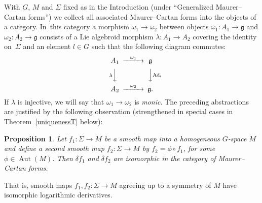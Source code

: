 \documentclass[11pt]{article}
\numberwithin{equation}{section}
\numberwithin{equation}{section}
\newtheorem{Proposition}[Theorem]{Proposition}
\DeclareMathOperator{\Adjoint}{Ad}
\DeclareMathOperator{\automorphism}{Aut}
\begin{document}
With $G$, $M$ and $\Sigma $ fixed as in the Introduction (under
``Generalized Maurer--Cartan forms'') we collect all associated
Maurer--Cartan forms into the objects of a category. In~this category a
morphism $\omega_1 \rightarrow \omega_2$ between objects
$\omega_1 \colon A_1 \rightarrow {\mathfrak g} $ and
$\omega_2 \colon A_2 \rightarrow {\mathfrak g} $ consists of a Lie
algebroid morphism $\lambda \colon A_1 \rightarrow A_2$ covering the
identity on~$\Sigma $ and an element $l \in G$ such that the following
diagram commutes:
 \begin{equation*}
 \begin{CD} A_1 @>{\omega_1}>> {\mathfrak g} \\ @V{\lambda}VV
@VV{\Adjoint_l}V \\ A_2 @>{\omega_2}>> {\mathfrak g}.
 \end{CD}
 \end{equation*} If $\lambda$ is injective, we will say that $\omega_1
\rightarrow \omega_2$ is {\it monic}. The preceding abstractions are
justified by the following observation (strengthened in special cases
in Theorem~\ref{uniquenessT} below):

\begin{Proposition}\label{morphismsP}
 Let $f_1\colon \Sigma \rightarrow M$ be a smooth map into a
 homogeneous $G$-space $M$ and define a second smooth map
 $f_2 \colon \Sigma \rightarrow M$ by $f_2 = \phi\circ f_1$, for
 some $\phi \in \automorphism(M)$. Then $\delta f_1$ and $\delta f_2$
 are isomorphic in the category of Maurer--Cartan forms.
\end{Proposition}

That is, smooth maps $f_1,f_2 \colon \Sigma \rightarrow M$ agreeing up
to a symmetry of $M$ have isomorphic logarithmic derivatives.
\end{document}
